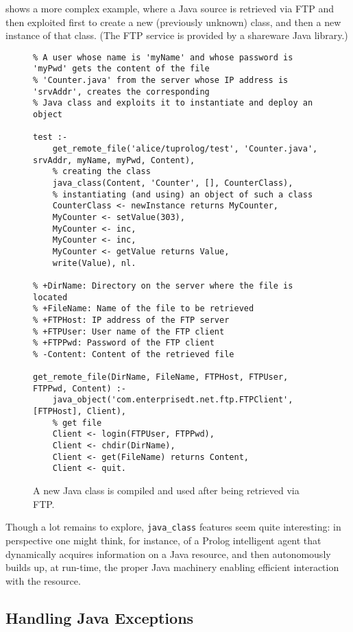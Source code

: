 shows a more complex example, where a Java source
is retrieved via FTP and then exploited first to create a new
(previously unknown) class, and then a new instance of that class.
(The FTP service is provided by a shareware Java library.)
%
\begin{figure}
\caption{A new Java class is compiled and used after being retrieved via FTP.
}
{\scriptsize
\begin{verbatim}
% A user whose name is 'myName' and whose password is 'myPwd' gets the content of the file
% 'Counter.java' from the server whose IP address is 'srvAddr', creates the corresponding
% Java class and exploits it to instantiate and deploy an object

test :-
    get_remote_file('alice/tuprolog/test', 'Counter.java', srvAddr, myName, myPwd, Content),
    % creating the class
    java_class(Content, 'Counter', [], CounterClass),
    % instantiating (and using) an object of such a class
    CounterClass <- newInstance returns MyCounter,
    MyCounter <- setValue(303),
    MyCounter <- inc,
    MyCounter <- inc,
    MyCounter <- getValue returns Value,
    write(Value), nl.

% +DirName: Directory on the server where the file is located
% +FileName: Name of the file to be retrieved
% +FTPHost: IP address of the FTP server
% +FTPUser: User name of the FTP client
% +FTPPwd: Password of the FTP client
% -Content: Content of the retrieved file

get_remote_file(DirName, FileName, FTPHost, FTPUser, FTPPwd, Content) :-
    java_object('com.enterprisedt.net.ftp.FTPClient', [FTPHost], Client),
    % get file
    Client <- login(FTPUser, FTPPwd),
    Client <- chdir(DirName),
    Client <- get(FileName) returns Content,
    Client <- quit.
\end{verbatim}
}
\end{figure}
%
Though a lot remains to explore, \texttt{java\_class} features
seem quite interesting: in perspective one might think, for
instance, of a Prolog intelligent agent that dynamically acquires
information on a Java resource, and then autonomously builds up,
at run-time, the proper Java machinery enabling efficient
interaction with the resource.

\subsection{Handling Java Exceptions}
\label{ssec:java-exceptions-in-tuprolog}

